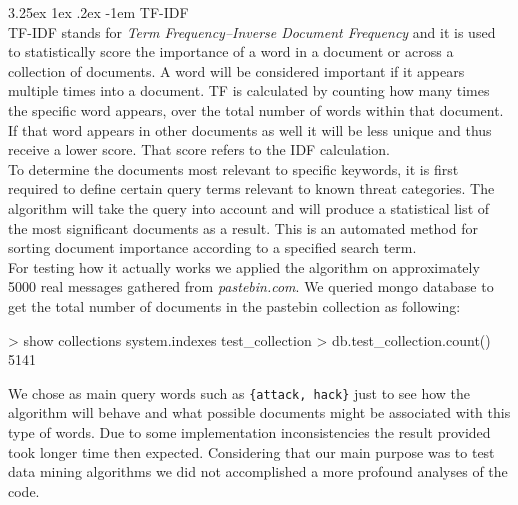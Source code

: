 \documentclass[12pt]{article}
\makeatletter
\renewcommand\paragraph{\@startsection{paragraph}{5}{\z@}%
  {3.25ex \@plus1ex \@minus.2ex}%
  {-1em}%
  {\normalfont\normalsize\bfseries}}
\makeatother
\begin{document}
\paragraph{TF-IDF}
\hfill \break
\\
TF-IDF \cite{tf-idf} stands for \textit{Term Frequency–Inverse Document Frequency} and it is used to statistically score the importance of a word in a document or across a collection of documents. A word will be considered important if it appears multiple times into a document. TF is calculated by counting how many times the specific word appears, over the total number of words within that document. If that word appears in other documents as well it will be less unique and thus receive a lower score. That score refers to the IDF calculation. 
\hfill \break 
\\
To determine the documents most relevant to specific keywords, it is first required to define certain query terms relevant to known threat categories. The algorithm will take the query into account and will produce a statistical list of the most significant documents as a result. This is an automated method for sorting document importance according to a specified search term. 
\hfill \break 
\\
For testing how it actually works we applied the algorithm on approximately 5000 real messages gathered from \textit{pastebin.com}. We queried mongo database to get the total number of documents in the pastebin collection as following:
\begin{spverbatim}
> show collections
system.indexes
test_collection
> db.test_collection.count()
5141
\end{spverbatim}
\hfill \break 
We chose as main query words such as \texttt{\{attack, hack\}} just to see how the algorithm will behave and what possible documents might be associated with this type of words. Due to some implementation inconsistencies the result provided took longer time then expected. Considering that our main purpose was to test data mining algorithms we did not accomplished a more profound analyses of the code.
\end{document}
